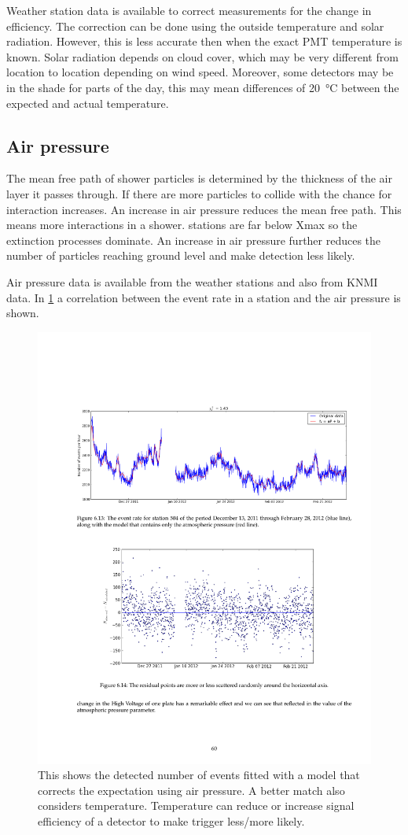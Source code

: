 Weather station data is available to correct measurements for the change in efficiency. The correction can be done using the outside temperature and solar radiation. However, this is less accurate then when the exact PMT temperature is known. Solar radiation depends on cloud cover, which may be very different from location to location depending on wind speed. Moreover, some detectors may be in the shade for parts of the day, this may mean differences of \SI{20}{\degreeCelsius} between the expected and actual temperature.


\subsection{Air pressure}

The mean free path of shower particles is determined by the thickness of the air layer it passes through. If there are more particles to collide with the chance for interaction increases. An increase in air pressure reduces the mean free path. This means more interactions in a shower. \hisparc stations are far below Xmax so the extinction processes dominate. An increase in air pressure further reduces the number of particles reaching ground level and make detection less likely.

Air pressure data is available from the \hisparc weather stations and also from KNMI data. In \cref{fig:rate_pressures} a correlation between the event rate in a station and the air pressure is shown.

\begin{figure}
    \centering
    \includegraphics[width=.7\linewidth]{plots/station/barometer}
    \caption{This shows the detected number of events fitted with a model that corrects the expectation using air pressure. A better match also considers temperature. Temperature can reduce or increase signal efficiency of a detector to make trigger less/more likely.}
    \label{fig:rate_pressures}
\end{figure}

